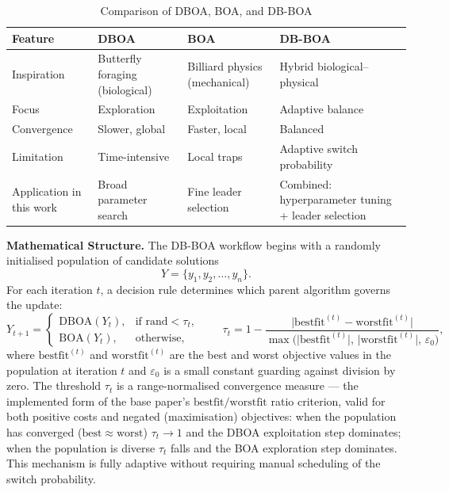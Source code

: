 \begin{table}[htbp]
\centering
\caption{Comparison of DBOA, BOA, and DB-BOA}
\label{tab:dboa_boa_dbboa_comparison}
\begin{tabular}{|p{3.2cm}|p{2.9cm}|p{2.9cm}|p{4.0cm}|}
\hline
\textbf{Feature} & \textbf{DBOA} & \textbf{BOA} & \textbf{DB-BOA} \\ \hline
Inspiration & Butterfly foraging (biological) & Billiard physics (mechanical) & Hybrid biological–physical \\ \hline
Focus & Exploration & Exploitation & Adaptive balance \\ \hline
Convergence & Slower, global & Faster, local & Balanced \\ \hline
Limitation & Time-intensive & Local traps & Adaptive switch probability \\ \hline
Application in this work & Broad parameter search & Fine leader selection & Combined: hyperparameter tuning + leader selection \\ \hline
\end{tabular}
\end{table}

\textbf{Mathematical Structure.}
The DB-BOA workflow begins with a randomly initialised population of candidate solutions
\begin{equation}\label{eq:population}
    Y = \{ y_1, y_2, \dots, y_n \}.
\end{equation}
For each iteration $t$, a decision rule determines which parent algorithm governs the update:
\begin{equation}\label{eq:switch}
    Y_{t+1} =
    \begin{cases}
        \mathrm{DBOA}(Y_t), & \text{if } \mathrm{rand} < \tau_t,\\[4pt]
        \mathrm{BOA}(Y_t),  & \text{otherwise},
    \end{cases}
    \qquad
    \tau_t = 1 - \frac{\bigl|\mathrm{bestfit}^{(t)} - \mathrm{worstfit}^{(t)}\bigr|}{\max\bigl(\bigl|\mathrm{bestfit}^{(t)}\bigr|,\,\bigl|\mathrm{worstfit}^{(t)}\bigr|,\,\varepsilon_0\bigr)},
\end{equation}
where $\mathrm{bestfit}^{(t)}$ and $\mathrm{worstfit}^{(t)}$ are the best and worst objective values in the population at iteration $t$ and $\varepsilon_0$ is a small constant guarding against division by zero. The threshold $\tau_t$ is a range-normalised convergence measure --- the implemented form of the base paper's $\mathrm{bestfit}/\mathrm{worstfit}$ ratio criterion, valid for both positive costs and negated (maximisation) objectives: when the population has converged ($\mathrm{best}\approx\mathrm{worst}$) $\tau_t \to 1$ and the DBOA exploitation step dominates; when the population is diverse $\tau_t$ falls and the BOA exploration step dominates. This mechanism is fully adaptive without requiring manual scheduling of the switch probability.

